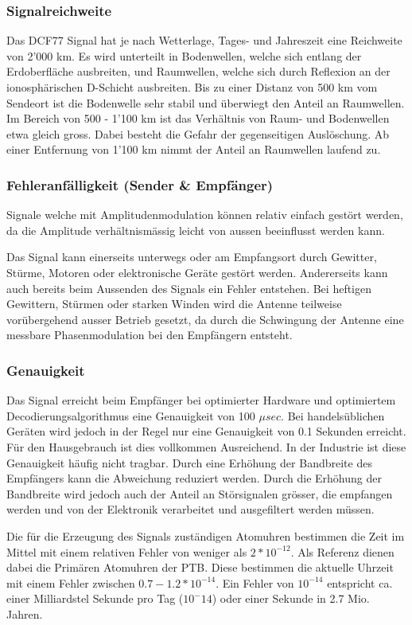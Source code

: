 \subsubsection{Signalreichweite}
Das DCF77 Signal hat je nach Wetterlage, Tages- und Jahreszeit eine Reichweite von 2'000 km. Es wird unterteilt in Bodenwellen, welche sich entlang der Erdoberfläche ausbreiten, und Raumwellen, welche sich durch Reflexion an der ionosphärischen D-Schicht ausbreiten. Bis zu einer Distanz von 500 km vom Sendeort ist die Bodenwelle sehr stabil und überwiegt den Anteil an Raumwellen. Im Bereich von 500 - 1'100 km ist das Verhältnis von Raum- und Bodenwellen etwa gleich gross. Dabei besteht die Gefahr der gegenseitigen Auslöschung. Ab einer Entfernung von 1'100 km nimmt der Anteil an Raumwellen laufend zu.

\subsubsection{Fehleranfälligkeit (Sender \& Empfänger)}
Signale welche mit Amplitudenmodulation können relativ einfach gestört werden, da die Amplitude verhältnismässig leicht von aussen beeinflusst werden kann.

Das Signal kann einerseits unterwegs oder am Empfangsort durch Gewitter, Stürme, Motoren oder elektronische Geräte gestört werden. Andererseits kann auch bereits beim Aussenden des Signals ein Fehler entstehen. Bei heftigen Gewittern, Stürmen oder starken Winden wird die Antenne teilweise vorübergehend ausser Betrieb gesetzt, da durch die Schwingung der Antenne eine messbare Phasenmodulation bei den Empfängern entsteht.

\subsubsection{Genauigkeit}
Das Signal erreicht beim Empfänger bei optimierter Hardware und optimiertem Decodierungsalgorithmus eine Genauigkeit von 100 ${\mu}sec$. Bei handelsüblichen Geräten wird jedoch in der Regel nur eine Genauigkeit von 0.1 Sekunden erreicht. Für den Hausgebrauch ist dies vollkommen Ausreichend. In der Industrie ist diese Genauigkeit  häufig nicht tragbar. Durch eine Erhöhung der Bandbreite des Empfängers kann die Abweichung reduziert werden. Durch die Erhöhung der Bandbreite wird jedoch auch der Anteil an Störsignalen grösser, die empfangen werden und von der Elektronik verarbeitet und ausgefiltert werden müssen.

Die für die Erzeugung des Signals zuständigen Atomuhren bestimmen die Zeit im Mittel mit einem relativen Fehler von weniger als $2*10^{-12}$. Als Referenz dienen dabei die Primären Atomuhren der PTB.
Diese bestimmen die aktuelle Uhrzeit mit einem Fehler zwischen $0.7 - 1.2 * 10^{-14}$. Ein Fehler von $10^{-14}$ entspricht ca. einer Milliardstel Sekunde pro Tag ($10^-14$) oder einer Sekunde in 2.7 Mio. Jahren.

